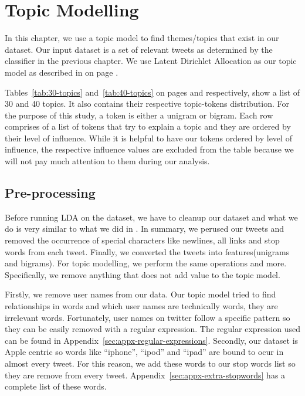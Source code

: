 \chapter{Topic Modelling}
\label{cha:topic-modelling}
In this chapter, we use a topic model to find themes/topics that exist in our dataset. Our input
dataset is a set of relevant tweets as determined by the classifier in the previous chapter. We use
Latent Dirichlet Allocation as our topic model as described in  on page
\pageref{sec:bg-lda}.

Tables~\ref{tab:30-topics} and~\ref{tab:40-topics} on pages \pageref{tab:30-topics} and
\pageref{tab:40-topics} respectively, show a list of 30 and 40 topics. It also contains their
respective topic-tokens distribution. For the purpose of this study, a token is either a unigram or
bigram. Each row comprises of a list of tokens that try to explain a topic and they are ordered by
their level of influence. While it is helpful to have our tokens ordered by level of influence, the
respective influence values are excluded from the table because we will not pay much attention to
them during our analysis.


\section{Pre-processing}
\label{sec:lda-preprocessing}
Before running LDA on the dataset, we have to cleanup our dataset and what we do is very similar to
what we did in . In summary, we perused our tweets and
removed the occurrence of special characters like newlines, all links and stop words from each tweet.
Finally, we converted the tweets into features(unigrams and bigrams). For topic modelling, we
perform the same operations and more. Specifically, we remove anything that does not add value to
the topic model.

Firstly, we remove user names from our data. Our topic model tried to find relationships in words
and which user names are technically words, they are irrelevant words. Fortunately, user names on
twitter follow a specific pattern so they can be easily removed with a regular expression. The
regular expression used can be found in Appendix~\ref{sec:appx-regular-expressions}. Secondly, our
dataset is Apple centric so words like ``iphone'', ``ipod'' and ``ipad'' are bound to ocur in almost
every tweet. For this reason, we add these words to our stop words list so they are remove from
every tweet. Appendix~\ref{sec:appx-extra-stopwords} has a complete list of these words.


